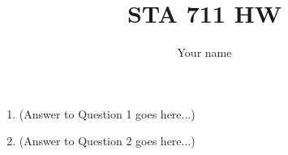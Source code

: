 \documentclass[12pt]{article}
\title{STA 711 HW}
\author{Your name}
\date{}
\begin{document}
\maketitle

\begin{enumerate}
\item (Answer to Question 1 goes here...)

\item (Answer to Question 2 goes here...)

\end{enumerate}
\end{document}
